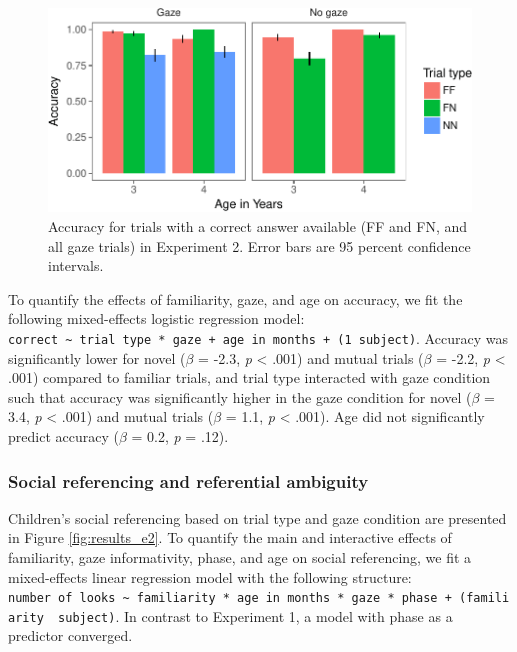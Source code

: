 \documentclass[a4paper,man,apacite,floatsintext]{apa6}
\newenvironment{CodeChunk}{}{}
\begin{document}
\begin{CodeChunk}
\begin{figure}[b]

{\centering \includegraphics{figs/acc_e2-1} 

}

\caption[Accuracy for trials with a correct answer available (FF and FN, and all gaze trials) in Experiment 2]{Accuracy for trials with a correct answer available (FF and FN, and all gaze trials) in Experiment 2. Error bars are 95 percent confidence intervals.}\label{fig:acc_e2}
\end{figure}
\end{CodeChunk}

To quantify the effects of familiarity, gaze, and age on accuracy, we
fit the following mixed-effects logistic regression model:
\texttt{correct\ \textasciitilde{}\ trial\ type\ *\ gaze\ +\ age\ in\ months\ +\ (1\textbar{}\ subject)}.
Accuracy was significantly lower for novel (\(\beta\) = -2.3, \emph{p}
\textless{} .001) and mutual trials (\(\beta\) = -2.2, \emph{p}
\textless{} .001) compared to familiar trials, and trial type interacted
with gaze condition such that accuracy was significantly higher in the
gaze condition for novel (\(\beta\) = 3.4, \emph{p} \textless{} .001)
and mutual trials (\(\beta\) = 1.1, \emph{p} \textless{} .001). Age did
not significantly predict accuracy (\(\beta\) = 0.2, \emph{p} = .12).

\subsubsection{Social referencing and referential
ambiguity}\label{social-referencing-and-referential-ambiguity}

Children's social referencing based on trial type and gaze condition are
presented in Figure \ref{fig:results_e2}. To quantify the main and
interactive effects of familiarity, gaze informativity, phase, and age
on social referencing, we fit a mixed-effects linear regression model
with the following structure:
\texttt{number\ of\ looks\ \textasciitilde{}\ familiarity\ *\ age\ in\ months\ *\ gaze\ *\ phase\ +\ (familiarity\ \textbar{}\ subject)}.
In contrast to Experiment 1, a model with phase as a predictor
converged.
\end{document}

